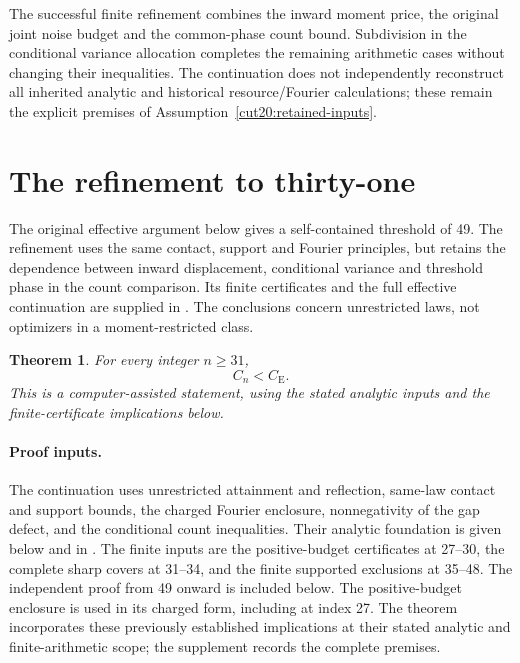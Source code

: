 \documentclass[11pt,a4paper]{article}
\numberwithin{equation}{section}
\newtheorem{theorem}{Theorem}[section]
\theoremstyle{definition}
\theoremstyle{remark}
\newcommand{\CE}{C_{\mathrm E}}
\begin{document}
The successful finite refinement combines the inward moment price,
the original joint noise budget and the common-phase count bound.
Subdivision in the conditional variance allocation completes the
remaining arithmetic cases without changing their inequalities.
The continuation does not independently reconstruct all inherited
analytic and historical resource/Fourier calculations; these remain
the explicit premises of Assumption~\ref{cut20:retained-inputs}.

\section{The refinement to thirty-one}\label{cut31:section}
The original effective argument below gives a self-contained threshold
of 49. The refinement uses the same contact, support and Fourier
principles, but retains the dependence between inward displacement,
conditional variance and threshold phase in the count comparison.
Its finite certificates and the full effective continuation are supplied
in \cite{EffectiveSupplement}. The conclusions concern unrestricted
laws, not optimizers in a moment-restricted class.

\begin{theorem}\label{cut31:global:main}
For every integer \(n\ge31\),
\[
 C_n<\CE.
\]
This is a computer-assisted statement, using the stated analytic
inputs and the finite-certificate implications below.
\end{theorem}

\paragraph{Proof inputs.}
The continuation uses unrestricted attainment and reflection,
same-law contact and support bounds, the charged Fourier enclosure,
nonnegativity of the gap defect, and the conditional count inequalities.
Their analytic foundation is given below and in
\cite{EffectiveSupplement}. The finite inputs are the positive-budget
certificates at 27--30, the complete sharp covers at 31--34, and the
finite supported exclusions at 35--48. The independent proof from
49 onward is included below. The positive-budget enclosure is used
in its charged form, including at index 27. The theorem incorporates
these previously established implications at their stated analytic
and finite-arithmetic scope; the supplement records the complete premises.
\end{document}
